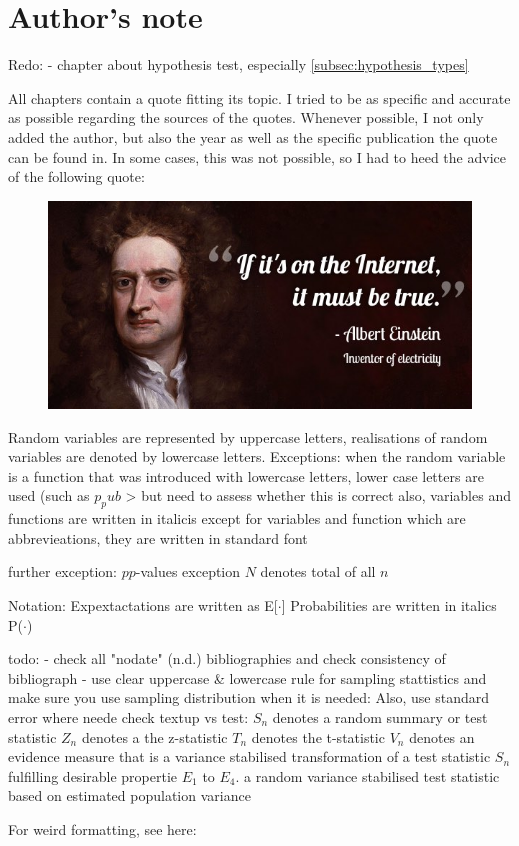 \chapter*{Author's note}
\label{cha:author's note}

Redo: 
- chapter about hypothesis test, especially \ref{subsec:hypothesis_types}

All chapters contain a quote fitting its topic. I tried to be as specific and accurate as possible regarding the sources of the quotes. Whenever possible, I not only added the author, but also the year as well as the specific publication the quote can be found in. In some cases, this was not possible, so I had to heed the advice of the following quote:
\begin{figure}[htp]
  \centering
  \includegraphics[width=.8\textwidth]{figures/if-its-on-the-internet.jpg}
  {\caption{}}
  \label{fig:if it's on the internet} %
\end{figure}

Random variables are represented by uppercase letters, realisations of random variables are denoted by lowercase letters.
Exceptions: when the random variable is a function that was introduced with lowercase letters, lower case letters are used (such as $p_pub$ > but need to assess whether this is correct
also, variables and functions are written in italicis except for variables and function which are abbrevieations, they are written in standard font

further exception: $pp$-values
exception $N$ denotes total of all $n$

Notation: 
Expextactations are written as E[$\cdot$]
Probabilities are written in italics P($\cdot$)

todo: 
- check all "nodate" (n.d.) bibliographies and check consistency of bibliograph
- use clear uppercase \& lowercase rule for sampling stattistics and make sure you use sampling distribution when it is needed: %
Also, use standard error where neede
check textup vs test: %
$S_n$ denotes a random summary or test statistic
$Z_n$ denotes a the z-statistic
$T_n$ denotes the t-statistic
$V_n$ denotes an evidence measure that is a variance stabilised transformation of a test statistic $S_n$ fulfilling desirable propertie $E_1$ to $E_4$. a random variance stabilised test statistic based on estimated population variance

For weird formatting, see here: %